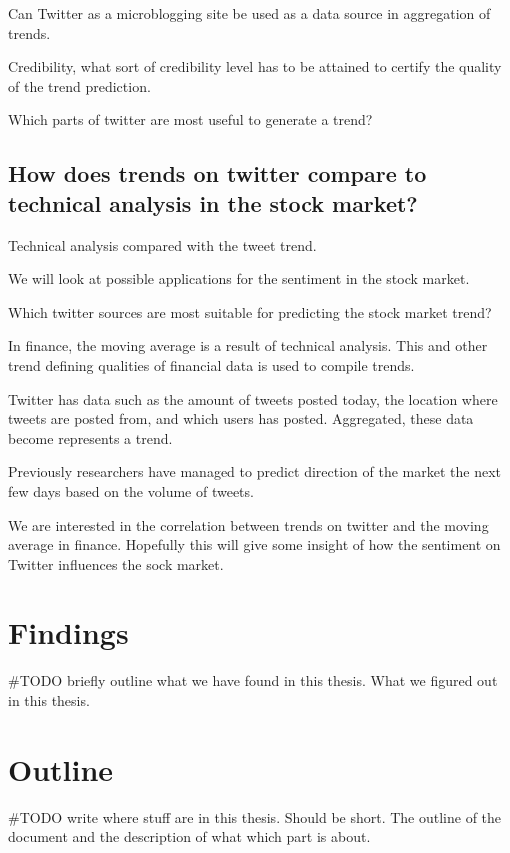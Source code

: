 Can Twitter as a microblogging site be used as a data source in aggregation of trends.

Credibility, what sort of credibility level has to be attained to certify the
quality of the trend prediction. 

Which parts of twitter are most useful to generate a trend?

\subsection{How does trends on twitter compare to technical analysis in the
stock market?\\}
Technical analysis compared with the tweet trend.

We will look at possible applications for the sentiment in the stock market.

Which twitter sources are most suitable for predicting the stock market
trend?

In finance, the moving average is a result of technical analysis. This and
other trend defining qualities of financial data is used to compile trends. 

Twitter has data such as the amount of tweets posted today, the location where
tweets are posted from, and which users has posted. Aggregated, these data
become represents a trend.  

Previously researchers have managed to predict direction of the market the
next few days based on the volume of tweets. 

We are interested in the correlation between trends on twitter and the moving
average in finance. Hopefully this will give some insight of how the sentiment on
Twitter influences the sock market.  

\section{Findings}
#TODO briefly outline what we have found in this thesis. 
What we figured out in this thesis. 

\section{Outline}
#TODO write where stuff are in this thesis. Should be short. 
The outline of the document and the description of what which part is about. 


